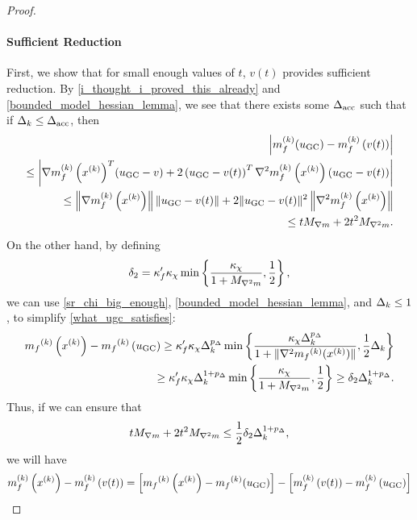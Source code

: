 \begin{proof}
\paragraph{Sufficient Reduction}
First, we show that for small enough values of $t$, $v(t)$ provides sufficient reduction.
By \cref{i_thought_i_proved_this_already} and \cref{bounded_model_hessian_lemma}, we see that there exists some ${\Delta_{\textrm{acc}}}$ such that if
$\Delta_k \le {\Delta_{\textrm{acc}}}$, then
\begin{align*}
\left|m_f^{(k)}(u_{\textrm{GC}}) - m_f^{(k)}\left(v(t)\right)\right| \\
\le \left|{\nabla m_f^{(k)}\left(x^{(k)}\right)}^T(u_{\textrm{GC}} - v) 
+ 2 \left(u_{\textrm{GC}} - v(t)\right) ^T \nabla^2m_f^{(k)}\left(x^{(k)}\right)\left(u_{\textrm{GC}} - v(t)\right) \right| \\
\le \left\|{\nabla m_f^{(k)}\left(x^{(k)}\right)}\right \|  \left\|u_{\textrm{GC}}- v(t)\right\| + 2  \|u_{\textrm{GC}} - v(t)\|^2 \left\|\nabla^2m_f^{(k)}\left(x^{(k)}\right)\right\| \\
\le t {M_{\nabla m}} + 2t^2{M_{\nabla^2 m}}. 
\end{align*}
On the other hand, by defining
\begin{align}
\delta_2 = \kappa_f' \kappa_{\chi} \min\left\{ \frac{\kappa_{\chi}}{1 + {M_{\nabla^2 m}}}, \frac 1 2 \right\}, \label{define_delta2}
\end{align}
we can use \cref{sr_chi_big_enough}, \cref{bounded_model_hessian_lemma}, and $\Delta_k \le 1$, to simplify \cref{what_ugc_satisfies}:
\begin{align*}
{{m}_f}^{(k)}\left(x^{(k)}\right) - {{m}_f}^{(k)}\left(u_{\textrm{GC}}\right)
\ge \kappa_f' \kappa_{\chi} \Delta_k^{p_{\Delta}} \min\left\{ \frac{\kappa_{\chi} \Delta_k^{p_{\Delta}}}{1+\|\nabla^2 {{m}_f}^{(k)}(x^{(k)})\|}, \frac 1 2 \Delta_k \right\} \\
\ge \kappa_f' \kappa_{\chi} \Delta_k^{1 + p_{\Delta}} \min\left\{ \frac{\kappa_{\chi}}{1 + {M_{\nabla^2 m}}}, \frac 1 2  \right\}
\ge \delta_2 \Delta_k^{1 + p_{\Delta}}.
\end{align*}
Thus, if we can ensure that
\begin{align}
t {M_{\nabla m}} + 2t^2{M_{\nabla^2 m}} \le \frac 1 2 \delta_2 \Delta_k^{1 + p_{\Delta}}, \label{ensure_this}
\end{align}
we will have
\begin{align*}
m_f^{(k)}\left(\xk\right) - m_f^{(k)}\left(v(t)\right) = \left[\mfk\left(\xk\right) - \mfk(u_{\textrm{GC}})\right] - \left[m_f^{(k)}\left(v(t)\right) - m_f^{(k)}\left(u_{\textrm{GC}}\right)\right] \nonumber \\

\end{align*}
\end{proof}
